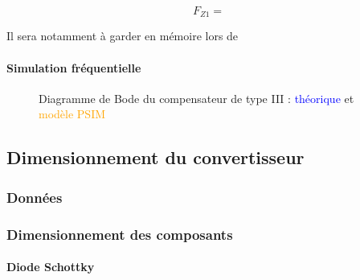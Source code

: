 				\begin{equation}
					F_{Z1} = 
					\label{freq_III_zero}
				\end{equation}
				
				Il sera notamment à garder en mémoire lors de 
					
				\paragraph{Simulation fréquentielle}  
					
				\begin{figure}[h]
					\begin{center}
					\end{center}
					\label{bode_comp_III}
					\caption{Diagramme de Bode du compensateur de type III : 
					\textcolor{blue}{théorique} et 
					\textcolor{orange}{modèle PSIM}}
				\end{figure}
					
		\subsection{Dimensionnement du convertisseur}
			
			\subsubsection{Données }
				
			\subsubsection{Dimensionnement des composants}
				
				\paragraph{Diode Schottky}
					
